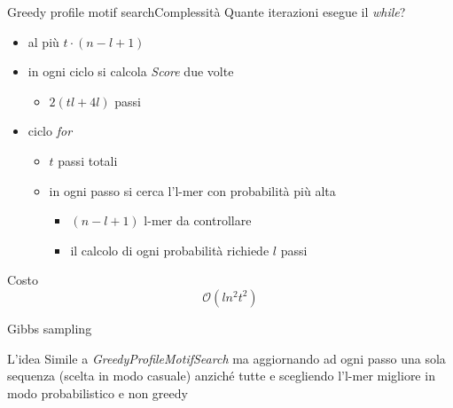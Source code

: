	\begin{frame}{Greedy profile motif search}{Complessità}
		Quante iterazioni esegue il \textit{while}?
		\begin{itemize}
			\item al più $t\cdot(n-l+1)$
			\item in ogni ciclo si calcola \textit{Score} due volte
			\begin{itemize}
				\item $2(tl+4l)$ passi
			\end{itemize}
			\item ciclo \textit{for}
			\begin{itemize}
				\item $t$ passi totali
				\item in ogni passo  si cerca l'l-mer con probabilità  più alta
				\begin{itemize}
					\item $(n-l+1)$ l-mer da controllare
					\item il calcolo di ogni probabilità richiede $l$ passi
				\end{itemize}
			\end{itemize}
		\end{itemize}
		\begin{center}
			\begin{minipage}{3cm}
				\begin{varblock}{Costo}
					$$\mathcal{O}(ln^2t^2)$$
				\end{varblock}
			\end{minipage}
		\end{center}
	\end{frame}
	
	\begin{frame}{Gibbs sampling}
		\begin{block}{L'idea}
			Simile a \textit{GreedyProfileMotifSearch} ma aggiornando ad ogni passo una sola sequenza (scelta in modo casuale) anziché tutte e scegliendo l'l-mer migliore in modo  probabilistico e non greedy
		\end{block}
	\end{frame}
	
